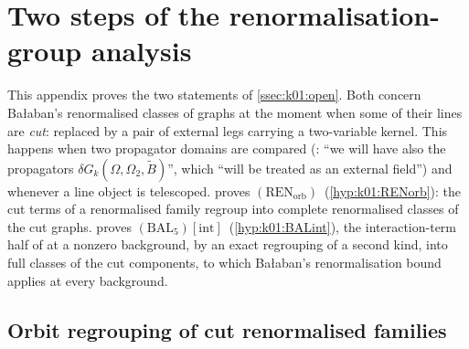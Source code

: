 \providecommand{\BALint}{\ensuremath{(\mathrm{BAL}_{5})[\mathrm{int}]}}
\providecommand{\RENorb}{\ensuremath{(\mathrm{REN}_{\mathrm{orb}})}}
\providecommand{\Cl}{\operatorname{Cl}}
\providecommand{\cutg}{\operatorname{cut}}
\providecommand{\OmA}{\ensuremath{\Omega_{A}}}
\providecommand{\OmC}{\ensuremath{\Omega_{C}}}
\providecommand{\Bt}{\ensuremath{\tilde B}}
\providecommand{\dG}{\ensuremath{\delta G}}
\providecommand{\dE}{\ensuremath{\delta E}}
\providecommand{\Lsev}{\ensuremath{\Lambda^{(k)}_{7}}}

\section{Two steps of the renormalisation-group analysis}\label{app:a07_k01steps}

This appendix proves the two statements of \cref{ssec:k01:open}. Both concern Ba{\l}aban's renormalised classes of graphs \cite[Sects.~1--3]{Ba3} at the moment when some of their lines are \emph{cut}: replaced by a pair of external legs carrying a two-variable kernel. This happens when two propagator domains are compared (\cite[p.~414]{Ba3}: ``we will have also the propagators $\delta G_k(\Omega,\Omega_2,\tilde B)$'', which ``will be treated as an external field'') and whenever a line object is telescoped.  proves \RENorb\ (\cref{hyp:k01:RENorb}): the cut terms of a renormalised family regroup into complete renormalised classes of the cut graphs.  proves \BALint\ (\cref{hyp:k01:BALint}), the interaction-term half of \cite[Prop.~2.6]{Ba2} at a nonzero background, by an exact regrouping of a second kind, into full classes of the cut components, to which Ba{\l}aban's renormalisation bound \cite[Prop.~1, (1.33)]{Ba3} applies at every background.

\subsection{Orbit regrouping of cut renormalised families}\label{ssec:a07:orb}

